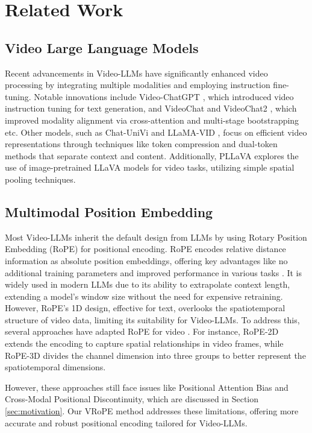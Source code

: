 \section{Related Work}
\subsection{Video Large Language Models}
Recent advancements in Video-LLMs have significantly enhanced video processing by integrating multiple modalities and employing instruction fine-tuning. Notable innovations include Video-ChatGPT \cite{maaz2023video}, which introduced video instruction tuning for text generation, and VideoChat \cite{li2023videochat} and VideoChat2 \cite{li2024mvbench}, which improved modality alignment via cross-attention and multi-stage bootstrapping etc. Other models, such as Chat-UniVi \cite{jin2024chat} and LLaMA-VID \cite{li2024llama}, focus on efficient video representations through techniques like token compression and dual-token methods that separate context and content. Additionally, PLLaVA \cite{xu2024pllava} explores the use of image-pretrained LLaVA models for video tasks, utilizing simple spatial pooling techniques.

\subsection{Multimodal Position Embedding}
Most Video-LLMs inherit the default design from LLMs by using Rotary Position Embedding (RoPE) \cite{su2024roformer} for positional encoding. RoPE encodes relative distance information as absolute position embeddings, offering key advantages like no additional training parameters and improved performance in various tasks \cite{su2024roformer}. It is widely used in modern LLMs due to its ability to extrapolate context length, extending a model's window size without the need for expensive retraining. However, RoPE's 1D design, effective for text, overlooks the spatiotemporal structure of video data, limiting its suitability for Video-LLMs. To address this, several approaches have adapted RoPE for video \cite{kexuefm-10040, wang2024qwen2}. For instance, RoPE-2D \cite{agrawal2024pixtral, wang2024qwen2} extends the encoding to capture spatial relationships in video frames, while RoPE-3D \cite{wang2024qwen2} divides the channel dimension into three groups to better represent the spatiotemporal dimensions.

However, these approaches still face issues like Positional Attention Bias and Cross-Modal Positional Discontinuity, which are discussed in Section \ref{sec:motivation}. Our VRoPE method addresses these limitations, offering more accurate and robust positional encoding tailored for Video-LLMs.
